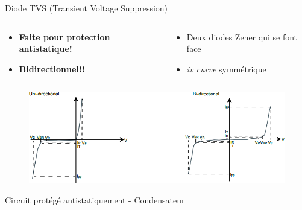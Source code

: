 \begin{frame}{Diode TVS (Transient Voltage Suppression)}
    \begin{columns}
        \begin{column}{0.5\textwidth}
            \begin{itemize}
                \item \textbf{Faite pour protection antistatique!}
                \item \textbf{Bidirectionnel!!}
            \end{itemize}
        \end{column}
        \begin{column}{0.5\textwidth}
            \begin{itemize}
                \item Deux diodes Zener qui se font face
                \item \textit{iv curve} symmétrique
            \end{itemize}
        \end{column}
    \end{columns}
    \begin{figure}
        \centering
        \includegraphics[width=\textwidth]{pictures/diode-tvs-iv-curve.png}
    \end{figure}
\end{frame}

\begin{frame}{Circuit protégé antistatiquement - Condensateur}
    \begin{center}
    \vspace{-24pt}
    \end{center}
\end{frame}


